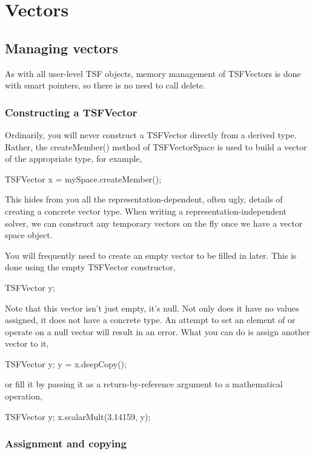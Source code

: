 \chapter{Vectors}

\section{Managing vectors}

As with all user-level TSF objects, memory management of TSFVectors is done 
with smart pointers, so there is no need to call delete. 

\subsection{Constructing a TSFVector}

Ordinarily, you will never construct a TSFVector directly from a derived type. 
Rather, the createMember() method of TSFVectorSpace is used to build a vector
of the appropriate type, for example,
\begin{code}
TSFVector x = mySpace.createMember();
\end{code}%
This hides from you all the representation-dependent, often ugly,
details of creating a concrete vector type. When writing a representation-independent 
solver, we can construct any temporary vectors on the fly once we have
a vector space object. 

You will frequently need to create an empty vector to be filled in later. This is done
using the empty TSFVector constructor,
\begin{code} 
TSFVector y;
\end{code}%
Note that this vector isn't just empty, it's null. Not only does it have no
values assigned, it does not have a concrete type. An attempt to set an element
of or operate on a null vector will result in an error. What you can do is
assign another vector to it,
\begin{code}
TSFVector y;
y = x.deepCopy();
\end{code}%
or fill it by passing it as a return-by-reference argument to a mathematical
operation,
\begin{code}
TSFVector y;
x.scalarMult(3.14159, y);
\end{code}

\subsection{Assignment and copying}

